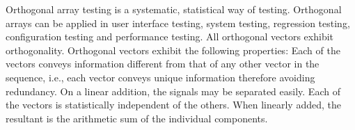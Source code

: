 Orthogonal array testing is a systematic, statistical way of testing. Orthogonal arrays can be applied in user interface testing, system testing, regression testing, configuration testing and performance testing.
All orthogonal vectors exhibit orthogonality. Orthogonal vectors exhibit the following properties:
Each of the vectors conveys information different from that of any other vector in the sequence, i.e., each vector conveys unique information therefore avoiding redundancy.
On a linear addition, the signals may be separated easily.
Each of the vectors is statistically independent of the others.
When linearly added, the resultant is the arithmetic sum of the individual components.

%
%
%
